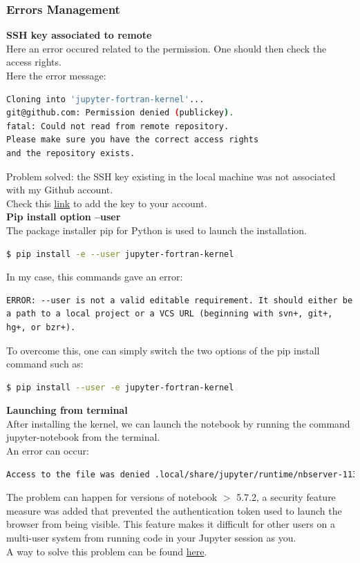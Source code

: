 \documentclass[10pt,a4paper]{article}
\begin{document}
\subsubsection{Errors Management}
\textbf{SSH key associated to remote}\\
Here an error occured related to the permission. One should then check the access rights.\\
Here the error message:\begin{lstlisting}[language=bash]
Cloning into 'jupyter-fortran-kernel'...
git@github.com: Permission denied (publickey).
fatal: Could not read from remote repository.
Please make sure you have the correct access rights
and the repository exists.
\end{lstlisting}
Problem solved: the SSH key existing in the local machine was not associated with my Github account.\\
Check this \href{https://docs.github.com/en/authentication/connecting-to-github-with-ssh/adding-a-new-ssh-key-to-your-github-account}{link} to add the key to your account.
\vspace{0.2cm}\\
\textbf{Pip install option --user}\\
The package installer pip for Python is used to launch the installation.
\begin{lstlisting}[language=bash]
$ pip install -e --user jupyter-fortran-kernel
\end{lstlisting}

\noindent In my case, this commands gave an error:
\begin{lstlisting}
ERROR: --user is not a valid editable requirement. It should either be a path to a local project or a VCS URL (beginning with svn+, git+, hg+, or bzr+).
\end{lstlisting}
To overcome this, one can simply switch the two options of the pip install command such as:
\begin{lstlisting}[language=bash]
$ pip install --user -e jupyter-fortran-kernel
\end{lstlisting}
\vspace{0.2cm}
\textbf{Launching from terminal}\\
After installing the kernel, we can launch the notebook by running the command jupyter-notebook from the terminal.\\
An error can occur:
\begin{lstlisting}[language=bash]
Access to the file was denied .local/share/jupyter/runtime/nbserver-113142-open.html is not readable
\end{lstlisting}
The problem can happen for versions of notebook $>$ 5.7.2, a security feature measure was added that prevented the authentication token used to launch the browser from being visible. This feature makes it difficult for other users on a multi-user system from running code in your Jupyter session as you.\\
A way to solve this problem can be found \href{https://stackoverflow.com/questions/70753768/jupyter-notebook-access-to-the-file-was-denied}{here}.
\end{document}
